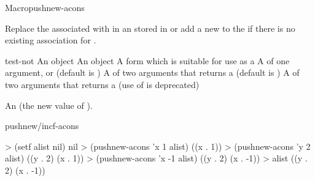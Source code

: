 \documentclass[10pt,twoside,english,pdftex]{article}
\begin{document}
\begin{functiondoc}{Macro}{pushnew-acons}{ 
     
    \returns{} } 
%
%
%
%
  
\fnsyntax

\fnpurpose Replace the  associated with  in an 
 stored in  or add a new   to the  if there is no 
existing association for .

\fnpackage {}

\fnmodule {}

\fnargs
\begin{args}{test-not}
\arg[item] An object
\arg[value] An object
\arg[place] A form which is suitable for use as a
\arg[key] A  of one argument, or \nil{} (default is \nil)
\arg[test] A  of two arguments that returns a
 (default is ) 
 A  of two arguments that returns a
 (use of  is deprecated)
\end{args}

\fnreturns An  (the new value of
). 

\begin{alsos}{pushnew/incf-acons}
\end{alsos}

\fnexamples
%
\W\supp
\begin{example}
> (setf alist nil)
nil
> (pushnew-acons 'x 1 alist)
((x . 1))
> (pushnew-acons 'y 2 alist)
((y . 2) (x . 1))\goodpagebreak
> (pushnew-acons 'x -1 alist)
((y . 2) (x . -1))
> alist
((y . 2) (x . -1))
\end{example}

\end{functiondoc}

\end{document}
